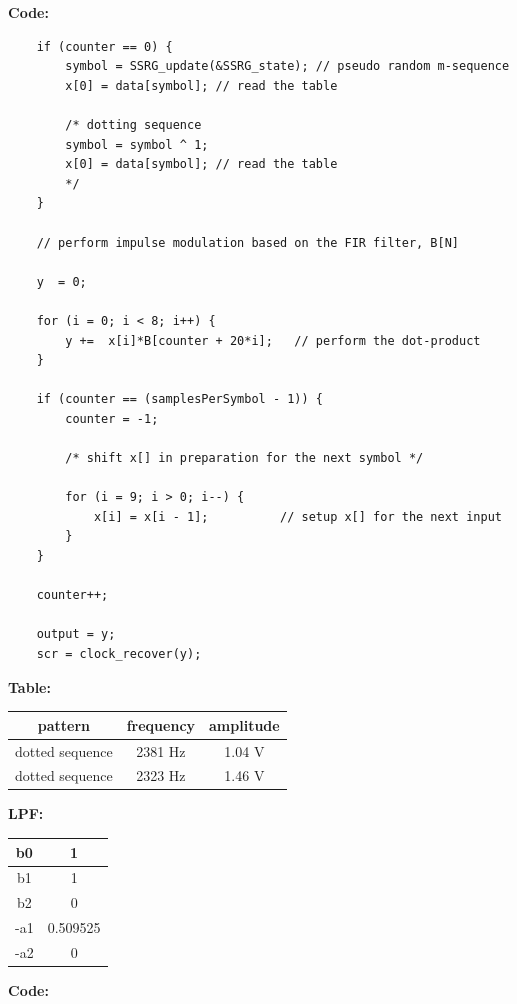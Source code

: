 \documentclass{article}
\begin{document}
\pagebreak
\textbf{Code:}

\begin{verbatim}
	if (counter == 0) {
		symbol = SSRG_update(&SSRG_state); // pseudo random m-sequence
		x[0] = data[symbol]; // read the table

		/* dotting sequence
		symbol = symbol ^ 1;
		x[0] = data[symbol]; // read the table
		*/
	}

	// perform impulse modulation based on the FIR filter, B[N] 

	y  = 0;

	for (i = 0; i < 8; i++) {
		y +=  x[i]*B[counter + 20*i];	// perform the dot-product
	}

	if (counter == (samplesPerSymbol - 1)) {
		counter = -1; 

		/* shift x[] in preparation for the next symbol */

		for (i = 9; i > 0; i--) {
			x[i] = x[i - 1];          // setup x[] for the next input
		}
	}

	counter++;

	output = y;
	scr = clock_recover(y);
\end{verbatim}

\textbf{Table:}

\begin{center}
\begin{tabular}{c|c|c}
pattern	&	frequency & amplitude \\ \hline
dotted sequence	&	 2381 Hz	&	1.04 V				\\ \hline
dotted sequence	&	 2323 Hz	&	1.46 V
\end{tabular}
\end{center}

\textbf{LPF:}

\begin{center}
\begin{tabular}{c|c}
b0	&	 1				\\ \hline
b1	&  1				\\ \hline
b2	&  0				\\ \hline
-a1	&	 0.509525\\ \hline
-a2	&	 0
\end{tabular}
\end{center}

\textbf{Code:}
\end{document}
